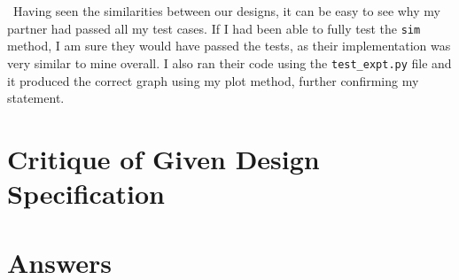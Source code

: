 \documentclass[12pt]{article}
\begin{document}
~\newline\noindent Having seen the similarities between our designs, it can be easy to see why my partner had passed all my test cases. If I had been able to fully test the \verb|sim| method, I am sure they would have passed the tests, as their implementation was very similar to mine overall. I also ran their code using the \verb|test_expt.py| file and it produced the correct graph using my plot method, further confirming my statement. 

\section{Critique of Given Design Specification}






\section{Answers}
\end{document}
